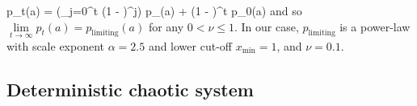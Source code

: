\documentclass[%
prx,
reprint,
superscriptaddress,
nofootinbib,
 amsmath,amssymb,
 aps,
floatfix,
]{revtex4-2}
\let\oldalign\align
\let\oldendalign\endalign
\renewenvironment{align}{%
    \linenomathNonumbers\oldalign%
    }{%
    \oldendalign\endlinenomath%
    }
\let\oldequation\equation
\let\oldendequation\endequation
\renewenvironment{equation}{%
    \linenomathNonumbers\oldequation
    }{%
    \oldendequation\endlinenomath%
    }
\begin{document}
\begin{equation}
p_t(a) = \nu \left(\sum\limits_{j=0}^t (1 - \nu)^j\right) p_{}(a) + (1 - \nu)^t p_0(a)\notag
\end{equation}
and so $\lim\limits_{t\rightarrow\infty} p_t(a) = p_{\text{limiting}}(a)$ for any $0<\nu\le 1$. In our case, $p_{\text{limiting}}$ is a power-law with scale exponent $\alpha = 2.5$ and lower cut-off $x_{\min} = 1$, and $\nu = 0.1$.

\subsection{Deterministic chaotic system}
\end{document}
